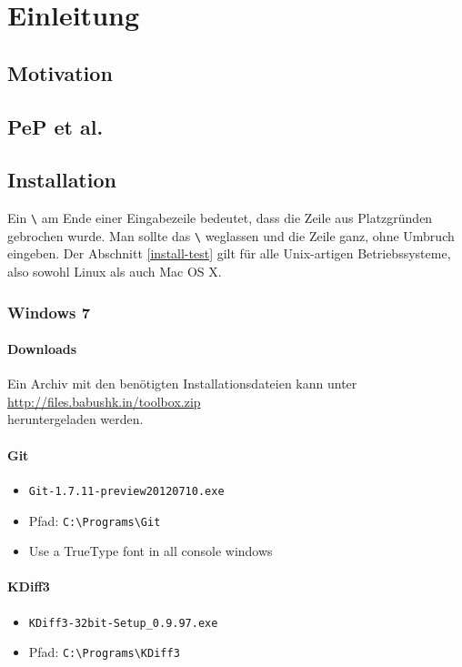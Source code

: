 \chapter{Einleitung}
\section{Motivation}
\section{PeP et al.}

\section{Installation}
Ein \verb|\| am Ende einer Eingabezeile bedeutet, dass die Zeile aus Platzgründen gebrochen wurde.
Man sollte das \verb|\| weglassen und die Zeile ganz, ohne Umbruch eingeben.
Der Abschnitt \ref{install-test} gilt für alle Unix-artigen Betriebssysteme, also sowohl Linux als auch Mac OS X.
\subsection{Windows 7}
\subsubsection{Downloads}
Ein Archiv mit den benötigten Installationsdateien kann unter \\
\url{http://files.babushk.in/toolbox.zip} \\
heruntergeladen werden.

\subsubsection{Git}
\begin{itemize}
  \item \texttt{Git-1.7.11-preview20120710.exe}
  \item Pfad: \verb|C:\Programs\Git|
  \item Use a TrueType font in all console windows
\end{itemize}

\subsubsection{KDiff3}
\begin{itemize}
  \item \texttt{KDiff3-32bit-Setup\_0.9.97.exe}
  \item Pfad: \verb|C:\Programs\KDiff3|
\end{itemize}

